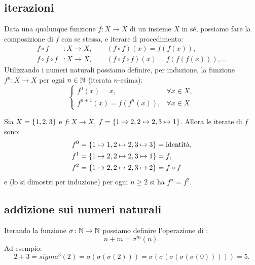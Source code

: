 \subsection{iterazioni}
%
%
%
Data una qualunque funzione $f\colon X \to X$ di un insieme $X$ in sé, 
possiamo fare la composizione di $f$ con se stessa, e iterare il procedimento: 
\begin{align*}
  f\circ f &\colon X\to X, 
    \qquad (f\circ f)(x) = f(f(x)),\\ 
  f\circ f \circ f&\colon X\to X,
    \qquad(f\circ f \circ f) (x) = f(f(f(x))), \dots   
\end{align*}
Utilizzando i numeri naturali possiamo definire, per induzione, 
la funzione $f^n\colon X\to X$ per ogni $n\in {\mathbb N}$ 
(iterata $n$-esima):
\[
\begin{cases}
  f^0(x) =  x, &\forall x\in X,\\
  f^{n+1}(x) = f(f^n(x)), &\forall x\in X.
\end{cases}  
\]
%
\begin{example}
Sia $X={\left\{ 1,2,3 \right\}}$ e $f\colon X\to X$, $f = {\left\{ 1\mapsto 2, 2 \mapsto 2, 3\mapsto 1 \right\}}$.
Allora le iterate di $f$ sono:
\begin{align*}
  f^0 &= {\left\{ 1\mapsto 1, 2\mapsto 2, 3\mapsto 3 \right\}} = \text{identità}, \\
  f^1 &= {\left\{ 1\mapsto 2, 2 \mapsto 2, 3\mapsto 1 \right\}} = f,\\
  f^2 &= {\left\{ 1\mapsto 2, 2\mapsto 2, 3\mapsto 2 \right\}} = f\circ f
\end{align*}
e (lo si dimostri per induzione) per ogni $n\ge 2$ si ha $f^n = f^2$.
\end{example}
%
\subsection{addizione sui numeri naturali}

Iterando la funzione $\sigma\colon {\mathbb N} \to {\mathbb N}$ possiamo definire 
l'operazione di :
\[
  n + m = \sigma^m(n).  
\]
Ad esempio:
\[
  2 + 3 = sigma^3(2) = \sigma(\sigma(\sigma(2))) = \sigma(\sigma(\sigma(\sigma(\sigma(0))))) = 5.
\]

